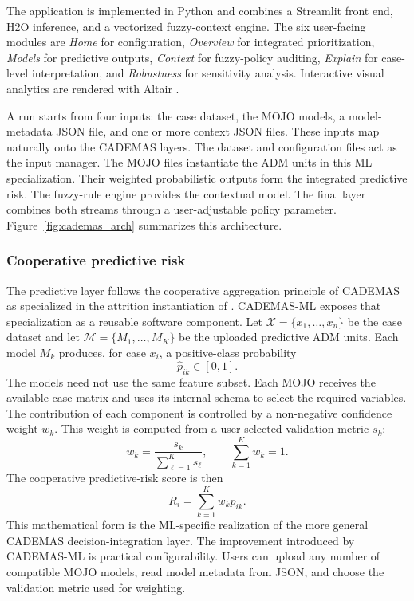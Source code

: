 \documentclass{interact}
\begin{document}
The application is implemented in Python and combines a Streamlit \citep{streamlit} front end, H2O \citep{H2O.ai2026} inference, and a vectorized fuzzy-context engine. The six user-facing modules are \textit{Home} for configuration, \textit{Overview} for integrated prioritization, \textit{Models} for predictive outputs, \textit{Context} for fuzzy-policy auditing, \textit{Explain} for case-level interpretation, and \textit{Robustness} for sensitivity analysis. Interactive visual analytics are rendered with Altair \citep{VanderPlas2018}.

A run starts from four inputs: the case dataset, the MOJO models, a model-metadata JSON file, and one or more context JSON files. These inputs map naturally onto the CADEMAS layers. The dataset and configuration files act as the input manager. The MOJO files instantiate the ADM units in this ML specialization. Their weighted probabilistic outputs form the integrated predictive risk. The fuzzy-rule engine provides the contextual model. The final layer combines both streams through a user-adjustable policy parameter. Figure~\ref{fig:cademas_arch} summarizes this architecture.

\subsubsection{Cooperative predictive risk}

The predictive layer follows the cooperative aggregation principle of CADEMAS as specialized in the attrition instantiation of \citet{Godz2026}. CADEMAS-ML exposes that specialization as a reusable software component. Let $\mathcal{X}=\{x_1,\ldots,x_n\}$ be the case dataset and let $\mathcal{M}=\{M_1,\ldots,M_K\}$ be the uploaded predictive ADM units. Each model $M_k$ produces, for case $x_i$, a positive-class probability
\[
\hat{p}_{ik} \in [0,1].
\]
The models need not use the same feature subset. Each MOJO receives the available case matrix and uses its internal schema to select the required variables. The contribution of each component is controlled by a non-negative confidence weight $w_k$. This weight is computed from a user-selected validation metric $s_k$:
\begin{equation}
w_k = \frac{s_k}{\sum_{\ell=1}^{K} s_\ell}, \qquad \sum_{k=1}^{K}w_k=1.
\label{eq:model_weights}
\end{equation}
The cooperative predictive-risk score is then
\begin{equation}
R_i=\sum_{k=1}^{K}w_k\hat{p}_{ik}.
\label{eq:ml_risk}
\end{equation}
This mathematical form is the ML-specific realization of the more general CADEMAS decision-integration layer. The improvement introduced by CADEMAS-ML is practical configurability. Users can upload any number of compatible MOJO models, read model metadata from JSON, and choose the validation metric used for weighting.
\end{document}
